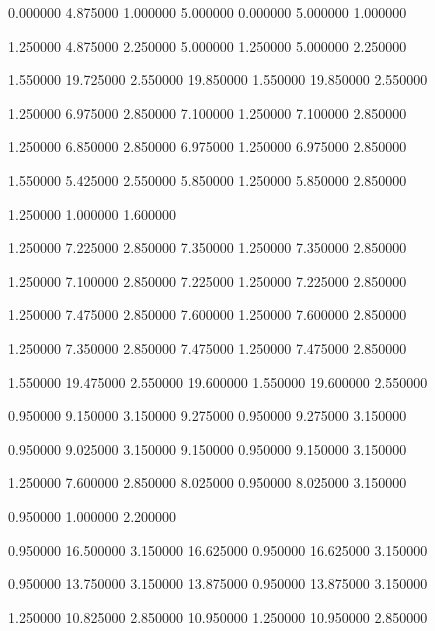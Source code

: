  {0.000000} {4.875000} {1.000000} {5.000000} {0.000000} {5.000000} {1.000000}

 {1.250000} {4.875000} {2.250000} {5.000000} {1.250000} {5.000000} {2.250000}

 {1.550000} {19.725000} {2.550000} {19.850000} {1.550000} {19.850000} {2.550000}

 {1.250000} {6.975000} {2.850000} {7.100000} {1.250000} {7.100000} {2.850000}

 {1.250000} {6.850000} {2.850000} {6.975000} {1.250000} {6.975000} {2.850000}

 {1.550000} {5.425000} {2.550000} {5.850000} {1.250000} {5.850000} {2.850000}

 {1.250000} {1.000000} {1.600000}

 {1.250000} {7.225000} {2.850000} {7.350000} {1.250000} {7.350000} {2.850000}

 {1.250000} {7.100000} {2.850000} {7.225000} {1.250000} {7.225000} {2.850000}

 {1.250000} {7.475000} {2.850000} {7.600000} {1.250000} {7.600000} {2.850000}

 {1.250000} {7.350000} {2.850000} {7.475000} {1.250000} {7.475000} {2.850000}

 {1.550000} {19.475000} {2.550000} {19.600000} {1.550000} {19.600000} {2.550000}

 {0.950000} {9.150000} {3.150000} {9.275000} {0.950000} {9.275000} {3.150000}

 {0.950000} {9.025000} {3.150000} {9.150000} {0.950000} {9.150000} {3.150000}

 {1.250000} {7.600000} {2.850000} {8.025000} {0.950000} {8.025000} {3.150000}

 {0.950000} {1.000000} {2.200000}

 {0.950000} {16.500000} {3.150000} {16.625000} {0.950000} {16.625000} {3.150000}

 {0.950000} {13.750000} {3.150000} {13.875000} {0.950000} {13.875000} {3.150000}

 {1.250000} {10.825000} {2.850000} {10.950000} {1.250000} {10.950000} {2.850000}

